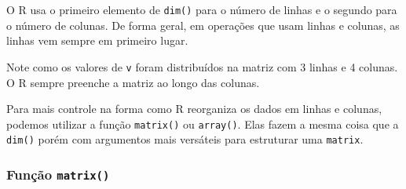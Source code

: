 \documentclass[]{book}
\newenvironment{Shaded}{\begin{snugshade}}{\end{snugshade}}
\newcommand{\KeywordTok}[1]{\textcolor[rgb]{0.13,0.29,0.53}{\textbf{#1}}}
\newcommand{\DecValTok}[1]{\textcolor[rgb]{0.00,0.00,0.81}{#1}}
\newcommand{\StringTok}[1]{\textcolor[rgb]{0.31,0.60,0.02}{#1}}
\newcommand{\CommentTok}[1]{\textcolor[rgb]{0.56,0.35,0.01}{\textit{#1}}}
\newcommand{\OperatorTok}[1]{\textcolor[rgb]{0.81,0.36,0.00}{\textbf{#1}}}
\newcommand{\NormalTok}[1]{#1}
\begin{document}
\begin{Shaded}
\end{Shaded}

O R usa o primeiro elemento de \texttt{dim()} para o número de linhas e
o segundo para o número de colunas. De forma geral, em operações que
usam linhas e colunas, as linhas vem sempre em primeiro lugar.

Note como os valores de \texttt{v} foram distribuídos na matriz com 3
linhas e 4 colunas. O R sempre preenche a matriz ao longo das colunas.

Para mais controle na forma como R reorganiza os dados em linhas e
colunas, podemos utilizar a função \texttt{matrix()} ou
\texttt{array()}. Elas fazem a mesma coisa que a \texttt{dim()} porém
com argumentos mais versáteis para estruturar uma \texttt{matrix}.

\subsubsection{\texorpdfstring{Função
\texttt{matrix()}}{Função matrix()}}\label{funcao-matrix}
\end{document}
